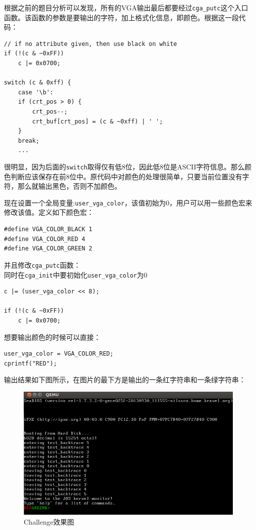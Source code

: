 根据之前的题目分析可以发现，所有的VGA输出最后都要经过\lstinline{cga_putc}这个入口函数。该函数的参数是要输出的字符，加上格式化信息，即颜色。根据这一段代码：\\
\begin{lstlisting}
// if no attribute given, then use black on white
if (!(c & ~0xFF))
    c |= 0x0700;

switch (c & 0xff) {
    case '\b':
    if (crt_pos > 0) {
        crt_pos--;
        crt_buf[crt_pos] = (c & ~0xff) | ' ';
    }
    break;
    ...
\end{lstlisting}

很明显，因为后面的\lstinline{switch}取得仅有低8位，因此低8位是ASCII字符信息。那么颜色判断应该保存在前8位中。原代码中对颜色的处理很简单，只要当前位置没有字符，那么就输出黑色，否则不加颜色。

现在设置一个全局变量:\lstinline{user_vga_color}，该值初始为0，用户可以用一些颜色宏来修改该值。定义如下颜色宏：\\
\begin{lstlisting}
#define VGA_COLOR_BLACK 1
#define VGA_COLOR_RED 4
#define VGA_COLOR_GREEN 2
\end{lstlisting}

并且修改\lstinline{cga_putc}函数：\\

同时在\lstinline{cga_init}中要初始化\lstinline{user_vga_color}为0\\
\begin{lstlisting}
c |= (user_vga_color << 8);

if (!(c & ~0xFF))
    c |= 0x0700;
\end{lstlisting}

想要输出颜色的时候可以直接：\\
\begin{lstlisting}
user_vga_color = VGA_COLOR_RED;
cprintf("RED");
\end{lstlisting}

输出结果如下图所示，在图片的最下方是输出的一条红字符串和一条绿字符串：\\
\begin{figure}[htbp] 
\centering\includegraphics[width=5.5in]{Figure1} 
\caption{Challenge效果图}\label{fig:1} 
\end{figure} 


